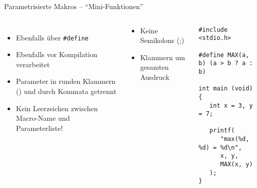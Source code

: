 \begin{frame}[fragile]{Parametrisierte Makros -- \enquote{Mini-Funktionen}}
%
\begin{columns}[b]
\begin{itemize}
\item Ebenfalls über \texttt{#define}
\item Ebenfalls vor Kompilation verarbeitet
\item Parameter in runden Klammern () und durch Kommata getrennt
\item Kein Leerzeichen zwischen Macro-Name und Parameterliste!
\end{itemize}
%
\begin{hintbox}
\begin{itemize}
\item Keine Semikolons (;)
\item Klammern um gesamten Ausdruck
\end{itemize}
\end{hintbox}
%
\begin{codebox}[Beispiel]
\begin{verbatim}
#include <stdio.h>

#define MAX(a, b) (a > b ? a : b)

int main (void) {
   int x = 3, y = 7;
   
   printf(
      "max(%d, %d) = %d\n", 
      x, y, 
      MAX(x, y)
   );
}
\end{verbatim}
\end{codebox}
\end{columns}
%
\end{frame}


